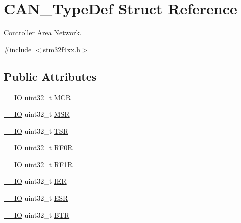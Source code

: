 \hypertarget{struct_c_a_n___type_def}{}\section{C\+A\+N\+\_\+\+Type\+Def Struct Reference}
\label{struct_c_a_n___type_def}


Controller Area Network.  




{\ttfamily \#include $<$stm32f4xx.\+h$>$}

\subsection*{Public Attributes}
\begin{DoxyCompactItemize}
\item 
\hyperlink{core__cm4_8h_aec43007d9998a0a0e01faede4133d6be}{\+\_\+\+\_\+\+IO} uint32\+\_\+t \hyperlink{struct_c_a_n___type_def_a1282eee79a22003257a7a5daa7f4a35f}{M\+CR}
\item 
\hyperlink{core__cm4_8h_aec43007d9998a0a0e01faede4133d6be}{\+\_\+\+\_\+\+IO} uint32\+\_\+t \hyperlink{struct_c_a_n___type_def_af98b957a4e887751fbd407d3e2cf93b5}{M\+SR}
\item 
\hyperlink{core__cm4_8h_aec43007d9998a0a0e01faede4133d6be}{\+\_\+\+\_\+\+IO} uint32\+\_\+t \hyperlink{struct_c_a_n___type_def_acbc82ac4e87e75350fc586be5e56d95b}{T\+SR}
\item 
\hyperlink{core__cm4_8h_aec43007d9998a0a0e01faede4133d6be}{\+\_\+\+\_\+\+IO} uint32\+\_\+t \hyperlink{struct_c_a_n___type_def_ad8e858479e26ab075ee2ddb630e8769d}{R\+F0R}
\item 
\hyperlink{core__cm4_8h_aec43007d9998a0a0e01faede4133d6be}{\+\_\+\+\_\+\+IO} uint32\+\_\+t \hyperlink{struct_c_a_n___type_def_a69a528d1288c1de666df68655af1d20e}{R\+F1R}
\item 
\hyperlink{core__cm4_8h_aec43007d9998a0a0e01faede4133d6be}{\+\_\+\+\_\+\+IO} uint32\+\_\+t \hyperlink{struct_c_a_n___type_def_a530babbc4b9584c93a1bf87d6ce8b8dc}{I\+ER}
\item 
\hyperlink{core__cm4_8h_aec43007d9998a0a0e01faede4133d6be}{\+\_\+\+\_\+\+IO} uint32\+\_\+t \hyperlink{struct_c_a_n___type_def_ab1a1b6a7c587443a03d654d3b9a94423}{E\+SR}
\item 
\hyperlink{core__cm4_8h_aec43007d9998a0a0e01faede4133d6be}{\+\_\+\+\_\+\+IO} uint32\+\_\+t \hyperlink{struct_c_a_n___type_def_accad1e4155459a13369f5ad0e7c6da29}{B\+TR}
\item 

\end{DoxyCompactItemize}
